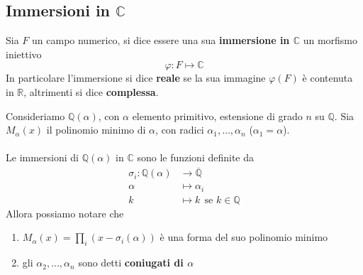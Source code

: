 \subsection{Immersioni in $\mathbb{C}$}
\begin{definizione}
	Sia $F$ un campo numerico, si dice essere una sua \textbf{immersione in $\mathbb{C}$} un morfismo iniettivo 
	\begin{equation*}
	\varphi: F \longmapsto \mathbb{C}
	\end{equation*}
	In particolare l'immersione si dice \textbf{reale} se la sua immagine $\varphi(F)$ è contenuta in $\mathbb{R}$, altrimenti si dice \textbf{complessa}.
\end{definizione}
\begin{osservazione}
	Consideriamo $\mathbb{Q}(\alpha)$, con $\alpha$ elemento primitivo, estensione di grado $n$ su $\mathbb{Q}$. Sia $M_\alpha(x)$ il polinomio minimo di $\alpha$, con radici $\alpha_1,\dots,\alpha_n$ ($\alpha_1=\alpha$). \\ \\ Le immersioni di $\mathbb{Q}(\alpha)$ in $\mathbb{C}$ sono le funzioni definite da 
	\begin{align*}
	\sigma_i:\mathbb{Q}(\alpha)&\longrightarrow \overline{\mathbb{Q}}\\
	\alpha&\longmapsto\alpha_i\\
	k&\longmapsto k \ \ \text{se $k\in\mathbb{Q}$}
	\end{align*}
	Allora possiamo notare che 
	\begin{enumerate}
		\item $M_\alpha(x)=\prod_i\left(x-\sigma_i(\alpha)\right)$ è una forma del suo polinomio minimo
		\item gli $\alpha_2,\dots,\alpha_n$ sono detti \textbf{coniugati di $\alpha$ }
	\end{enumerate}
\end{osservazione}
